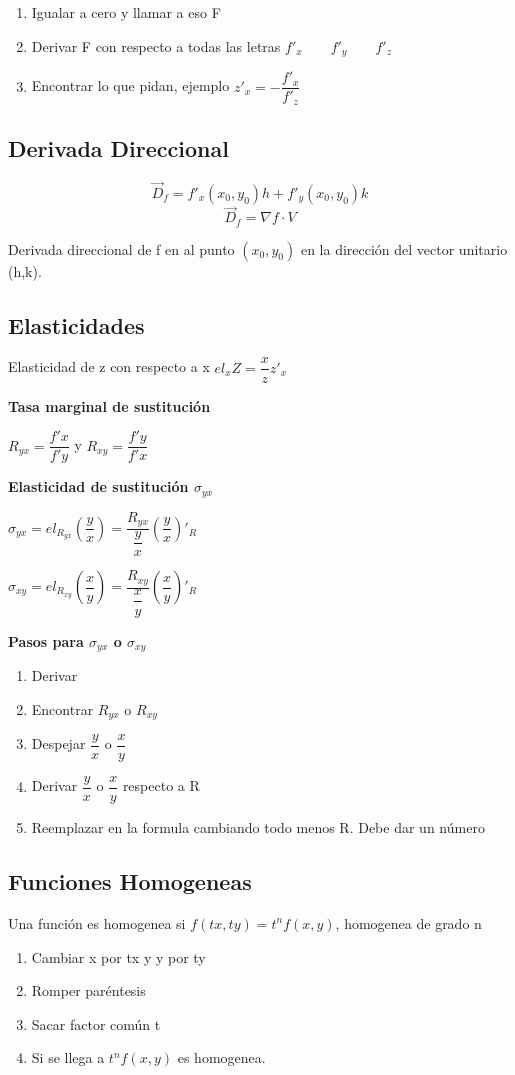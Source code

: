 \begin{enumerate}
	\item Igualar a cero y llamar a eso F
	\item Derivar F con respecto a todas las letras $f'_x \qquad f'_y \qquad f'_z$
	\item Encontrar lo que pidan, ejemplo $z'_x=-\dfrac{f'_x}{f'_z}$
\end{enumerate}

\subsection{Derivada Direccional}

$$\overrightarrow{D}_f=f'_x(x_0,y_0)h+f'_y(x_0,y_0)k$$
$$\overrightarrow{D}_f=\nabla f \cdot V$$

Derivada direccional de f en al punto $(x_0,y_0)$ en la dirección del vector unitario (h,k).

\subsection{Elasticidades}

Elasticidad de z con respecto a x $el_xZ=\dfrac{x}{z}z'_x$

\textbf{Tasa marginal de sustitución}

$R_{yx}=\dfrac{f'x}{f'y}$ y $R_{xy}=\dfrac{f'y}{f'x}$

\textbf{Elasticidad de sustitución $\sigma_{yx}$}

$\sigma_{yx}=el_{R_{yx}}(\dfrac{y}{x})=\dfrac{R_{yx}}{\dfrac{y}{x}}(\dfrac{y}{x})'_R$

$\sigma_{xy}=el_{R_{xy}}(\dfrac{x}{y})=\dfrac{R_{xy}}{\dfrac{x}{y}}(\dfrac{x}{y})'_R$

\textbf{Pasos para $\sigma_{yx}$ o $\sigma_{xy}$}

\begin{enumerate}
	\item Derivar
	\item Encontrar $R_{yx}$ o $R_{xy}$
	\item Despejar $\dfrac{y}{x}$ o $\dfrac{x}{y}$
	\item Derivar $\dfrac{y}{x}$ o $\dfrac{x}{y}$ respecto a R
	\item Reemplazar en la formula cambiando todo menos R. Debe dar un número
\end{enumerate}

\subsection{Funciones Homogeneas}
Una función es homogenea si $f(tx,ty)=t^nf(x,y)$, homogenea de grado n
\begin{enumerate}
	\item Cambiar x por tx y y por ty
	\item Romper paréntesis
	\item Sacar factor común t
	\item Si se llega a $t^nf(x,y)$ es homogenea.
\end{enumerate}

